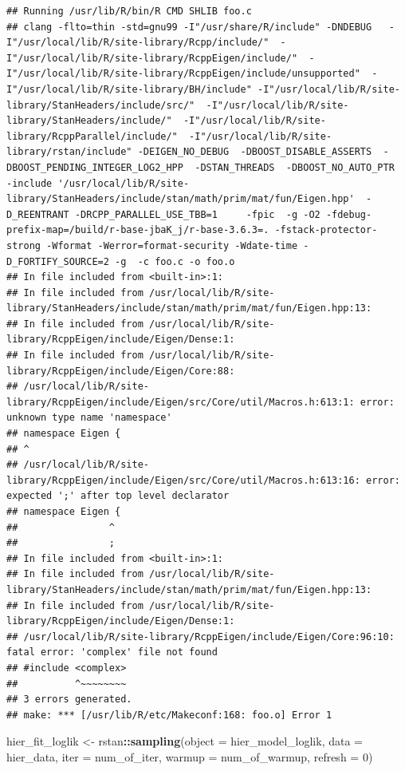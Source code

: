 \documentclass[
]{article}
\newenvironment{Shaded}{\begin{snugshade}}{\end{snugshade}}
\newcommand{\DataTypeTok}[1]{\textcolor[rgb]{0.13,0.29,0.53}{#1}}
\newcommand{\DecValTok}[1]{\textcolor[rgb]{0.00,0.00,0.81}{#1}}
\newcommand{\KeywordTok}[1]{\textcolor[rgb]{0.13,0.29,0.53}{\textbf{#1}}}
\newcommand{\NormalTok}[1]{#1}
\newcommand{\OperatorTok}[1]{\textcolor[rgb]{0.81,0.36,0.00}{\textbf{#1}}}
\newcommand{\StringTok}[1]{\textcolor[rgb]{0.31,0.60,0.02}{#1}}
\begin{document}
\begin{verbatim}
## Running /usr/lib/R/bin/R CMD SHLIB foo.c
## clang -flto=thin -std=gnu99 -I"/usr/share/R/include" -DNDEBUG   -I"/usr/local/lib/R/site-library/Rcpp/include/"  -I"/usr/local/lib/R/site-library/RcppEigen/include/"  -I"/usr/local/lib/R/site-library/RcppEigen/include/unsupported"  -I"/usr/local/lib/R/site-library/BH/include" -I"/usr/local/lib/R/site-library/StanHeaders/include/src/"  -I"/usr/local/lib/R/site-library/StanHeaders/include/"  -I"/usr/local/lib/R/site-library/RcppParallel/include/"  -I"/usr/local/lib/R/site-library/rstan/include" -DEIGEN_NO_DEBUG  -DBOOST_DISABLE_ASSERTS  -DBOOST_PENDING_INTEGER_LOG2_HPP  -DSTAN_THREADS  -DBOOST_NO_AUTO_PTR  -include '/usr/local/lib/R/site-library/StanHeaders/include/stan/math/prim/mat/fun/Eigen.hpp'  -D_REENTRANT -DRCPP_PARALLEL_USE_TBB=1     -fpic  -g -O2 -fdebug-prefix-map=/build/r-base-jbaK_j/r-base-3.6.3=. -fstack-protector-strong -Wformat -Werror=format-security -Wdate-time -D_FORTIFY_SOURCE=2 -g  -c foo.c -o foo.o
## In file included from <built-in>:1:
## In file included from /usr/local/lib/R/site-library/StanHeaders/include/stan/math/prim/mat/fun/Eigen.hpp:13:
## In file included from /usr/local/lib/R/site-library/RcppEigen/include/Eigen/Dense:1:
## In file included from /usr/local/lib/R/site-library/RcppEigen/include/Eigen/Core:88:
## /usr/local/lib/R/site-library/RcppEigen/include/Eigen/src/Core/util/Macros.h:613:1: error: unknown type name 'namespace'
## namespace Eigen {
## ^
## /usr/local/lib/R/site-library/RcppEigen/include/Eigen/src/Core/util/Macros.h:613:16: error: expected ';' after top level declarator
## namespace Eigen {
##                ^
##                ;
## In file included from <built-in>:1:
## In file included from /usr/local/lib/R/site-library/StanHeaders/include/stan/math/prim/mat/fun/Eigen.hpp:13:
## In file included from /usr/local/lib/R/site-library/RcppEigen/include/Eigen/Dense:1:
## /usr/local/lib/R/site-library/RcppEigen/include/Eigen/Core:96:10: fatal error: 'complex' file not found
## #include <complex>
##          ^~~~~~~~~
## 3 errors generated.
## make: *** [/usr/lib/R/etc/Makeconf:168: foo.o] Error 1
\end{verbatim}

\begin{Shaded}
\begin{Highlighting}[]
\NormalTok{hier\_fit\_loglik \textless{}{-}}\StringTok{ }\NormalTok{rstan}\OperatorTok{::}\KeywordTok{sampling}\NormalTok{(}\DataTypeTok{object =}\NormalTok{ hier\_model\_loglik,}
                            \DataTypeTok{data =}\NormalTok{ hier\_data,}
                            \DataTypeTok{iter =}\NormalTok{ num\_of\_iter,}
                            \DataTypeTok{warmup =}\NormalTok{ num\_of\_warmup,}
                            \DataTypeTok{refresh =} \DecValTok{0}\NormalTok{)}
\end{Highlighting}
\end{Shaded}
\end{document}
